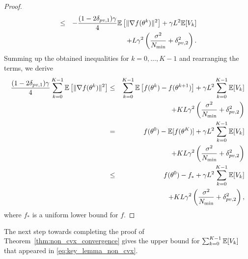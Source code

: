 \begin{proof}
\begin{eqnarray*}
    &\le& -\frac{(1-2\delta_{pv,1})\gamma}{4}\mathbb{E}\left[\|\nabla f(\theta^k)\|^2\right] + \gamma L^2 \mathbb{E}[V_k]\notag\\
    &&\quad + L\gamma^2\left(\frac{\sigma^2}{N_{\min}} + \delta_{pv,2}^2\right).
\end{eqnarray*}
Summing up the obtained inequalities for $k = 0,\ldots, K-1$ and rearranging the terms, we derive
\begin{eqnarray*}
    \frac{(1-2\delta_{pv,1})\gamma}{4}\sum\limits_{k=0}^{K-1}\mathbb{E}\left[\|\nabla f(\theta^k)\|^2\right] &\le& \sum\limits_{k=0}^{K-1} \mathbb{E}\left[f(\theta^k) - f(\theta^{k+1})\right] + \gamma L^2\sum\limits_{k=0}^{K-1} \mathbb{E}[V_k]\notag\\
    &&\quad + KL\gamma^2\left(\frac{\sigma^2}{N_{\min}} + \delta_{pv,2}^2\right)\\
    &=& f(\theta^0) - \mathbb{E}[f(\theta^{K})] + \gamma L^2\sum\limits_{k=0}^{K-1} \mathbb{E}[V_k] \\
    &&\quad + KL\gamma^2\left(\frac{\sigma^2}{N_{\min}} + \delta_{pv,2}^2\right)\\
    &\le& f(\theta^0) - f_* + \gamma L^2\sum\limits_{k=0}^{K-1} \mathbb{E}[V_k]\\
    &&\quad + KL\gamma^2\left(\frac{\sigma^2}{N_{\min}} + \delta_{pv,2}^2\right),
\end{eqnarray*}
where $f_*$ is a uniform lower bound for $f$.
\end{proof}
The next step towards completing the proof of Theorem~\ref{thm:non_cvx_convergence} gives the upper bound for $\sum_{k=0}^{K-1} \mathbb{E}[V_k]$ that appeared in \eqref{eq:key_lemma_non_cvx}.

